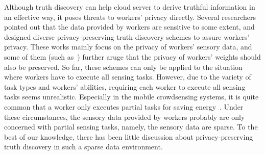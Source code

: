 \documentclass[conference]{IEEEtran}
\begin{document}
Although truth discovery can help cloud server to derive truthful information in an effective way, it poses threats to workers' privacy directly.
Several researchers~\cite{miao_cloud-enabled_2015,xu_efficient_2019,miao_lightweight_2017,zhang_reliable_2019,xue_inpptd_2020,tang_achieving_2021} pointed out that the data provided by workers are sensitive to some extent, and designed diverse privacy-preserving truth discovery schemes to assure workers' privacy.
These works mainly focus on the privacy of workers' sensory data, and some of them (such as~\cite{zhang_reliable_2019,xue_inpptd_2020,tang_achieving_2021}) further aruge that the privacy of workers' weights should also be preserved.
So far, these schemes can only be applied to the situation where workers have to execute all sensing tasks.
However, due to the variety of task types and workers' abilities, requiring each worker to execute all sensing tasks seems unrealistic.
Especially in the mobile crowdsensing systems, it is quite common that a worker only executes partial tasks for saving energy~\cite{wang_sparse_2016,wang_energy_2018}.
Under these circumstances, the sensory data provided by workers probably are only concerned with partial sensing tasks, namely, the sensory data are sparse.
To the best of our knowledge, there has been little discussion about privacy-preserving truth discovery in such a sparse data environment.
\end{document}
